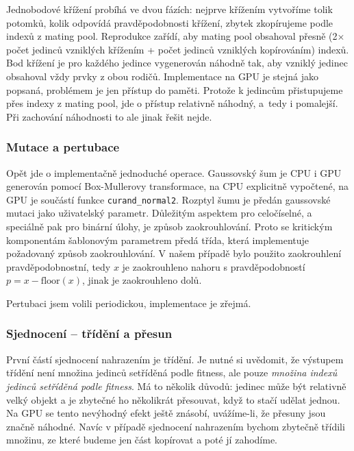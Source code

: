 Jednobodové křížení probíhá ve dvou fázích: nejprve křížením vytvoříme tolik potomků, kolik odpovídá pravděpodobnosti křížení, zbytek zkopírujeme podle indexů z mating pool. Reprodukce zařídí, aby mating pool obsahoval přesně (2$\times$počet jedinců vzniklých křížením + počet jedinců vzniklých kopírováním) indexů. Bod křížení je pro každého jedince vygenerován náhodně tak, aby vzniklý jedinec obsahoval vždy prvky z obou rodičů. Implementace na GPU je stejná jako popsaná, problémem je jen přístup do paměti. Protože k jedincům přistupujeme přes indexy z mating pool, jde o přístup relativně náhodný, a~tedy i pomalejší. Při zachování náhodnosti to ale jinak řešit nejde.

\subsubsection{Mutace a pertubace}

Opět jde o implementačně jednoduché operace. Gaussovský šum je CPU i GPU generován pomocí Box-Mullerovy transformace, na CPU explicitně vypočtené, na GPU je součástí funkce \texttt{curand\_normal2}. Rozptyl šumu je předán gaussovské mutaci jako uživatelský parametr. Důležitým aspektem pro celočíselné, a speciálně pak pro binární úlohy, je způsob zaokrouhlování. Proto se kritickým komponentám šablonovým parametrem předá třída, která implementuje požadovaný způsob zaokrouhlování. V našem případě bylo použito zaokrouhlení pravděpodobnostní, tedy $x$ je zaokrouhleno nahoru s pravděpodobností $p = x - \text{floor}(x)$, jinak je zaokrouhleno dolů.

Pertubaci jsem volili periodickou, implementace je zřejmá.

\subsubsection{Sjednocení -- třídění a přesun}

První částí sjednocení nahrazením je třídění. Je nutné si uvědomit, že výstupem třídění není množina jedinců setříděná podle fitness, ale pouze \emph{množina indexů jedinců setříděná podle fitness}. Má to několik důvodů: jedinec může být relativně velký objekt a je zbytečné ho několikrát přesouvat, když to stačí udělat jednou. Na GPU se tento nevýhodný efekt ještě znásobí, uvážíme-li, že přesuny jsou značně náhodné. Navíc v případě sjednocení nahrazením bychom zbytečně třídili množinu, ze které budeme jen část kopírovat a poté jí zahodíme.

